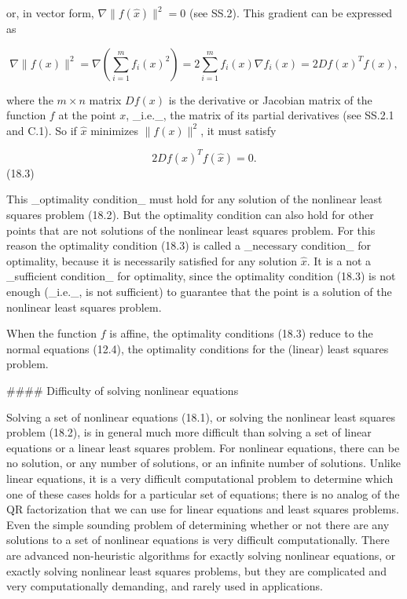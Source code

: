 or, in vector form, \(\nabla\|f(\hat{x})\|^{2}=0\) (see SS.2). This gradient can be expressed as

\[\nabla\|f(x)\|^{2}=\nabla\left(\sum_{i=1}^{m}f_{i}(x)^{2}\right)=2\sum_{i=1}^{m} f_{i}(x)\nabla f_{i}(x)=2Df(x)^{T}f(x),\]

where the \(m\times n\) matrix \(Df(x)\) is the derivative or Jacobian matrix of the function \(f\) at the point \(x\), _i.e._, the matrix of its partial derivatives (see SS.2.1 and C.1). So if \(\hat{x}\) minimizes \(\|f(x)\|^{2}\), it must satisfy

\[2Df(\hat{x})^{T}f(\hat{x})=0.\] (18.3)

This _optimality condition_ must hold for any solution of the nonlinear least squares problem (18.2). But the optimality condition can also hold for other points that are not solutions of the nonlinear least squares problem. For this reason the optimality condition (18.3) is called a _necessary condition_ for optimality, because it is necessarily satisfied for any solution \(\hat{x}\). It is a not a _sufficient condition_ for optimality, since the optimality condition (18.3) is not enough (_i.e._, is not sufficient) to guarantee that the point is a solution of the nonlinear least squares problem.

When the function \(f\) is affine, the optimality conditions (18.3) reduce to the normal equations (12.4), the optimality conditions for the (linear) least squares problem.

#### Difficulty of solving nonlinear equations

Solving a set of nonlinear equations (18.1), or solving the nonlinear least squares problem (18.2), is in general much more difficult than solving a set of linear equations or a linear least squares problem. For nonlinear equations, there can be no solution, or any number of solutions, or an infinite number of solutions. Unlike linear equations, it is a very difficult computational problem to determine which one of these cases holds for a particular set of equations; there is no analog of the QR factorization that we can use for linear equations and least squares problems. Even the simple sounding problem of determining whether or not there are any solutions to a set of nonlinear equations is very difficult computationally. There are advanced non-heuristic algorithms for exactly solving nonlinear equations, or exactly solving nonlinear least squares problems, but they are complicated and very computationally demanding, and rarely used in applications.

